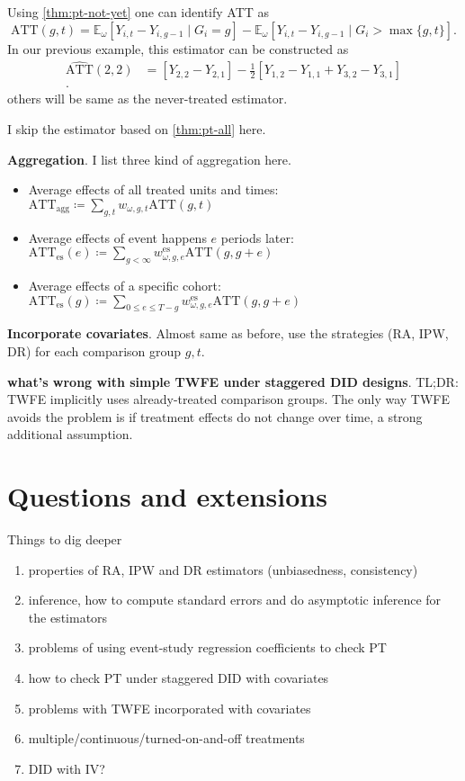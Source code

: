 \documentclass[12pt]{article}
\begin{document}
Using \autoref{thm:pt-not-yet} one can identify ATT as
\[
  \text{ATT}(g,t) = \mathbb{E}_{\omega}[Y_{i,t}-Y_{i,g-1} \mid G_i=g] -
  \mathbb{E}_{\omega}[Y_{i,t}-Y_{i,g-1} \mid G_i > \max \{g,t\} ]
.\]
In our previous example, this estimator can be constructed as
\begin{align*}
  \widehat{\text{ATT}}(2,2) &= [Y_{2,2}-Y_{2,1}] - \frac{1}{2} [Y_{1,2}-Y_{1,1} +
  Y_{3,2}-Y_{3,1}] \\
  .
\end{align*}
others will be same as the never-treated estimator.

I skip the estimator based on \autoref{thm:pt-all} here.


\textbf{Aggregation}. I list three kind of aggregation here.
\begin{itemize}
  \item Average effects of all treated units and times: \( \text{ATT}_{\text{agg}}
    \coloneqq \sum_{g,t} w_{\omega, g,t} \text{ATT}(g,t) \)
  \item Average effects of event happens \( e \) periods later: \(
      \text{ATT}_{\text{es}}(e) \coloneqq \sum_{g < \infty} w^{\text{es}}_{\omega, g, e}
    \text{ATT}(g,g+e)  \)
  \item Average effects of a specific cohort: \( \text{ATT}_{\text{es}}(g) \coloneqq
    \sum_{0 \le e \le T-g} w^{\text{es}}_{\omega, g, e} \text{ATT}(g,g+e)  \)
\end{itemize}

\textbf{Incorporate covariates}. Almost same as before, use the strategies (RA, IPW, DR)
for each comparison group \( g,t \).

\textbf{what's wrong with simple TWFE under staggered DID designs}. TL;DR: TWFE
implicitly uses already-treated comparison groups. The only
way TWFE avoids the problem is if treatment effects do not change over time, a strong additional
assumption.

\section{Questions and extensions}

Things to dig deeper

\begin{enumerate}
  \item properties of RA, IPW and DR estimators (unbiasedness, consistency)
  \item inference, how to compute standard errors and do asymptotic inference for the estimators
  \item problems of using event-study regression coefficients to check PT
  \item how to check PT under staggered DID with covariates
  \item problems with TWFE incorporated with covariates
  \item multiple/continuous/turned-on-and-off treatments
  \item DID with IV?
\end{enumerate}
\end{document}
